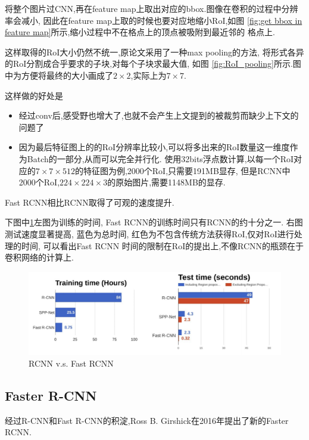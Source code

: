 将整个图片过CNN,再在feature map上取出对应的bbox.图像在卷积的过程中分辨率会减小,
因此在feature map上取的时候也要对应地缩小RoI,如图
\ref{fig:get bbox in feature map}所示,缩小过程中不在格点上的顶点被吸附到最近邻的
格点上.

这样取得的RoI大小仍然不统一,原论文采用了一种max pooling的方法,
将形式各异的RoI分割成合乎要求的子块,对每个子块求最大值,
如图 \ref{fig:RoI_pooling}所示.图中为方便将最终的大小画成了$2\times 2$,实际上为$7\times 7$.

这样做的好处是

\begin{itemize}
    \item 经过conv后,感受野也增大了,也就不会产生上文提到的被裁剪而缺少上下文的问题了
    \item 因为最后特征图上的的RoI分辨率比较小,可以将多出来的RoI数量这一维度作为Batch的一部分,从而可以完全并行化.
    使用32bits浮点数计算,以每一个RoI对应的$7\times 7\times 512$的特征图为例,2000个RoI,只需要191MB显存,
    但是RCNN中2000个RoI,$224\times 224\times 3$的原始图片,需要1148MB的显存.
\end{itemize}

Fast RCNN相比RCNN取得了可观的速度提升.

下图中\ref{fig:rcnn_vs_frcnn}左图为训练的时间,
Fast RCNN的训练时间只有RCNN的约十分之一.
右图测试速度显著提高, 蓝色为总时间,
红色为不包含传统方法获得RoI,仅对RoI进行处理的时间,
可以看出Fast RCNN
时间的限制在RoI的提出上,不像RCNN的瓶颈在于卷积网络的计算上.

\begin{figure}[htbp]
    \centering
    \includegraphics[scale=0.65]{figures/rcnn_vs_frcnn.png}
    \caption{RCNN v.s. Fast RCNN}
    \label{fig:rcnn_vs_frcnn}
\end{figure}

\subsection{Faster R-CNN}

经过R-CNN和Fast R-CNN的积淀,Ross B. Girshick在2016年提出了新的Faster RCNN.

